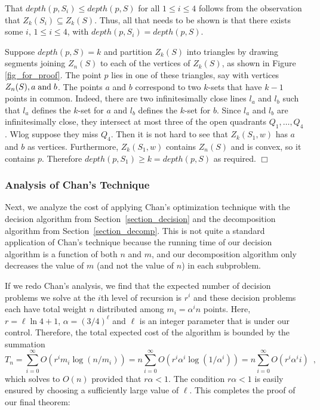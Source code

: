 \documentclass{elsart}
\newenvironment{proof}{{\bf Proof:} \rm}{\hfill $\Box$ \medskip\\}
\newcommand{\depth}{\mathit{depth}}
\begin{document}
\begin{proof} 
That $\depth(p,S_i)\le \depth(p,S)$ for all $1\le i\le 4$ follows from
the observation that $Z_k(S_i) \subseteq Z_k(S)$.  Thus, all that
needs to be shown is that there exists some $i$, $1\le i\le 4$, with
$\depth(p,S_i)=\depth(p,S)$. 

Suppose $depth(p,S) = k$ and partition $Z_k(S)$ into triangles by
drawing segments joining $Z_n(S)$ to each of the vertices of $Z_k(S)$,
as shown in Figure \ref{fig_for_proof}. The point $p$ lies in one of
these triangles, say with vertices $Z_n(S), a \hspace{1mm} \mbox{and}
\hspace{1mm} b$. The points $a$ and $b$ correspond to two $k$-sets
that have $k-1$ points in common. Indeed, there are two
infinitesimally close lines $l_a$ and $l_b$ such that $l_a$ defines
the $k$-set for $a$ and $l_b$ defines the $k$-set for $b$. Since $l_a$
and $l_b$ are infinitesimally close, they intersect at most three of
the open quadrants $Q_1, \ldots, Q_4$. Wlog suppose they miss $Q_4$. Then
it is not hard to see that $Z_k(S_1,w)$ has $a$ and $b$ as vertices.
Furthermore, $Z_k(S_1,w)$ contains $Z_n(S)$ and is convex, so it
contains $p$. Therefore $depth(p,S_1) \ge k = depth(p,S)$ as required.
\end{proof}

\subsubsection{Analysis of Chan's Technique}

Next, we analyze the cost of applying Chan's optimization technique
with the decision algorithm from Section~\ref{section_decision} and
the decomposition algorithm from Section~\ref{section_decomp}.  This
is not quite a standard application of Chan's technique because the
running time of our decision algorithm is a function of both $n$ and
$m$, and our decomposition algorithm only decreases the value of $m$
(and not the value of $n$) in each subproblem. 

If we redo Chan's analysis, we find that the expected number of
decision problems we solve at the $i$th level of recursion is $r^i$
and these decision problems each have total weight $n$ distributed
among $m_i=\alpha^i n$ points.  Here, $r=\ell\ln4+1$,
$\alpha=(3/4)^\ell$ and $\ell$ is an integer parameter that is under
our control.  Therefore, the total expected cost of the algorithm is
bounded by the summation
\[
   T_n = \sum_{i=0}^\infty O\left(r^im_i\log (n/m_i)\right)
   = n\sum_{i=0}^\infty O\left(r^i\alpha^i \log(1/\alpha^i)\right)
   = n\sum_{i=0}^\infty O\left(r^i\alpha^i i\right) \enspace ,
\]
which solves to $O(n)$ provided that $r\alpha < 1$.  The condition
$r\alpha < 1$ is easily ensured by choosing a sufficiently large
value of $\ell$.  This completes the proof of our final theorem:
\end{document}
